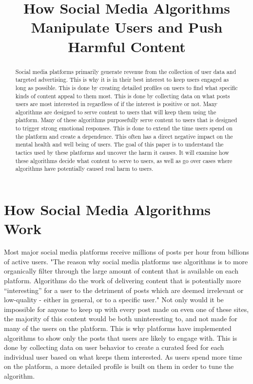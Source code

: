 \documentclass[conference]{IEEEtran}
\begin{document}
\title{How Social Media Algorithms Manipulate Users and Push Harmful Content\\}

\author{}

\maketitle 

\begin{abstract}

Social media platforms primarily generate revenue from the collection of user data and targeted advertising. This is why it is in their best interest to keep users engaged as long as possible. This is done by creating detailed profiles on users to find what specific kinds of content appeal to them most. This is done by collecting data on what posts users are most interested in regardless of if the interest is positive or not. Many algorithms are designed to serve content to users that will keep them using the platform. Many of these algorithms purposefully serve content to users that is designed to trigger strong emotional responses. This is done to extend the time users spend on the platform and create a dependence. This often has a direct negative impact on the mental health and well being of users. The goal of this paper is to understand the tactics used by these platforms and uncover the harm it causes. It will examine how these algorithms decide what content to serve to users, as well as go over cases where algorithms have potentially caused real harm to users. 

\end{abstract}

\section{How Social Media Algorithms Work}

Most major social media platforms receive millions of posts per hour from billions of active users. "The reason why social media platforms use algorithms is to more organically filter through the large amount of content that is available on each platform. Algorithms do the work of delivering content that is potentially more “interesting” for a user to the detriment of posts which are deemed irrelevant or low-quality - either in general, or to a specific user."\cite{algorithms2021} Not only would it be impossible for anyone to keep up with every post made on even one of these sites, the majority of this content would be both uninteresting to, and not made for many of the users on the platform. This is why platforms have implemented algorithms to show only the posts that users are likely to engage with. This is done by collecting data on user behavior to create a curated feed for each individual user based on what keeps them interested. As users spend more time on the platform, a more detailed profile is built on them in order to tune the algorithm.
\end{document}
